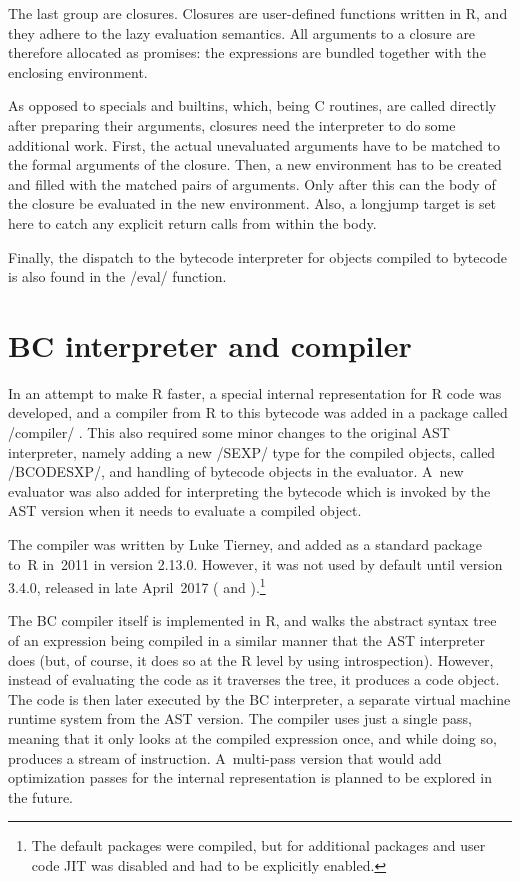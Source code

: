 {The last group are closures. Closures are user-defined functions written in R, and they adhere to the lazy evaluation semantics. All arguments to a closure are therefore allocated as promises: the expressions are bundled together with the enclosing environment.

As opposed to specials and builtins, which, being C routines, are called directly after preparing their arguments, closures need the interpreter to do some additional work. First, the actual unevaluated arguments have to be matched to the formal arguments of the closure. Then, a new environment has to be created and filled with the matched pairs of arguments. Only after this can the body of the closure be evaluated in the new environment. Also, a longjump target is set here to catch any explicit return calls from within the body.

Finally, the dispatch to the bytecode interpreter for objects compiled to bytecode is also found in the \cinline/eval/ function.


\section{BC interpreter and compiler}

In an attempt to make R faster, a special internal representation for R code was developed, and a compiler from R to this bytecode was added in a package called \rinline/compiler/ \autocite{compiler}. This also required some minor changes to the original AST interpreter, namely adding a new \cinline/SEXP/ type for the compiled objects, called \cinline/BCODESXP/, and handling of bytecode objects in the evaluator. A~new evaluator was also added for interpreting the bytecode which is invoked by the AST version when it needs to evaluate a compiled object.

The compiler was written by Luke Tierney, and added as a standard package to~R in~2011 in version 2.13.0. However, it was not used by default until version 3.4.0, released in late April~2017 (\autocite{announce2011} and \autocite{announce2017}).\footnote{The default packages were compiled, but for additional packages and user code JIT was disabled and had to be explicitly enabled.}

The BC compiler itself is implemented in R, and walks the abstract syntax tree of an expression being compiled in a similar manner that the AST interpreter does (but, of course, it does so at the R level by using introspection). However, instead of evaluating the code as it traverses the tree, it produces a code object. The code is then later executed by the BC interpreter, a separate virtual machine runtime system from the AST version. The compiler uses just a single pass, meaning that it only looks at the compiled expression once, and while doing so, produces a stream of instruction. A~multi-pass version that would add optimization passes for the internal representation is planned to be explored in the future.

}
